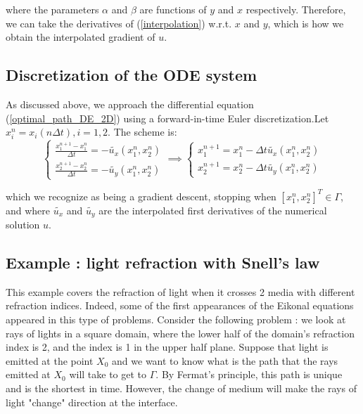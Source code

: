 \documentclass[11pt]{article}
\theoremstyle{definition}
\theoremstyle{remark}
\begin{document}
\noindent where the parameters $\alpha$ and $\beta$ are functions of $y$ and $x$ respectively. Therefore, we can take the derivatives of (\ref{interpolation}) w.r.t. $x$ and $y$, which is how we obtain the interpolated gradient of $u$.


\subsection{Discretization of the ODE system}
As discussed above, we approach the differential equation (\ref{optimal_path_DE_2D}) using a forward-in-time Euler discretization.Let $x_i^{n}=x_i(n\Delta t), i=1,2$. The scheme is:
\begin{equation}
    \begin{cases}
        \frac{x_1^{n+1}-x_1^n}{\Delta t}=-\tilde{u_x}(x_1^n,x_2^n) \\
        \frac{x_2^{n+1}-x_2^n}{\Delta t}=-\tilde{u_y}(x_1^n,x_2^n)
    \end{cases} \implies
    \begin{cases}
        x_1^{n+1} = x_1^n-\Delta t\tilde{u_x}(x_1^n,x_2^n) \\
        x_2^{n+1} = x_2^n-\Delta t\tilde{u_y}(x_1^n,x_2^n)
    \end{cases}
\end{equation}

\noindent which we recognize as being a gradient descent, stopping when $[x_1^n,x_2^n]^T\in \Gamma$, and where $\tilde{u_x}$ and $\tilde{u_y}$ are the interpolated first derivatives of the numerical solution $u$.

\subsection{Example : light refraction with Snell's law}
\label{section_snells_law}
This example covers the refraction of light when it crosses 2 media with different refraction indices. Indeed, some of the first appearances of the Eikonal equations appeared in this type of problems. Consider the following problem : we look at rays of lights in a square domain, where the lower half of the domain's refraction index is 2, and the index is 1 in the upper half plane. Suppose that light is emitted at the point $X_0$ and we want to know what is the path that the rays emitted at $X_0$ will take to get to $\Gamma$. By Fermat's principle, this path is unique and is the shortest in time. However, the change of medium will make the rays of light "change" direction at the interface. \\
\end{document}
